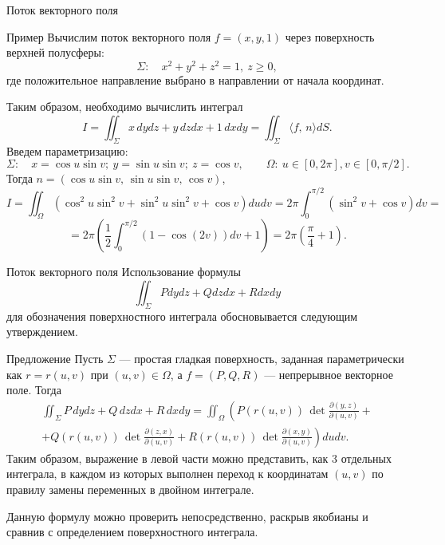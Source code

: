 \documentclass[8pt]{beamer}
\newcommand{\pp}[2]{\frac{\partial #1}{\partial #2}}
\newcommand{\ds}{\displaystyle}
\begin{document}

\begin{frame}{Поток векторного поля}
\begin{block}{Пример}
Вычислим поток векторного поля $f=(x,y,1)$ через поверхность верхней полусферы:
$$\Sigma:\quad x^2+y^2+z^2=1,\ z\ge 0,$$
где положительное направление выбрано в направлении от начала координат.

Таким образом, необходимо вычислить интеграл
$$I = \iint_\Sigma x\,dydz+y\,dzdx+1\,dxdy = \iint_\Sigma \langle f,\,n\rangle dS.$$
Введем параметризацию:
$$\Sigma:\quad x=\cos u \sin v;\ y =\sin u \sin v;\ z=\cos v,\qquad \Omega:\ u \in[0,2\pi], v\in[0,\pi/2].$$
Тогда $\ds n = (\cos u \sin v,\, \sin u \sin v,\, \cos v)$,
$$I = \iint_\Omega \left( \cos^2 u \sin^2 v + \sin^2u \sin^2v+\cos v\right)dudv=2\pi \int_0^{\pi/2}(\sin^2 v+\cos v)dv = $$
$$ = 2\pi\left( \frac12 \int_0^{\pi/2}(1-\cos(2 v))dv+1\right) = 2\pi\left(\frac{\pi}{4}+1\right).$$

\end{block}
\end{frame}

\begin{frame}{Поток векторного поля}
Использование формулы
$$\iint_\Sigma Pdydz+Qdzdx+Rdxdy$$
для обозначения поверхностного интеграла обосновывается следующим утверждением.
\begin{block}{Предложение}
Пусть $\Sigma$ --- простая гладкая поверхность, заданная параметрически как $r=r(u,v)$ при $(u,v)\in\Omega$, а $f=(P,Q,R)$ --- непрерывное векторное поле. Тогда
\begin{multline*}
\iint_\Sigma P\, dydz+Q\, dzdx+R\, dxdy = \iint_\Omega\left( P(r(u,v))\, \det\pp{(y,z)}{(u,v)} +
\right. \\ \left.
+ Q(r(u,v))\, \det\pp{(z,x)}{(u,v)}+ R(r(u,v))\, \det\pp{(x,y)}{(u,v)}\right)dudv.
\end{multline*}
Таким образом, выражение в левой части можно представить, как 3 отдельных интеграла, в каждом из которых выполнен переход к координатам $(u,v)$ по правилу замены переменных в двойном интеграле.
\end{block}
Данную формулу можно проверить непосредственно, раскрыв якобианы и сравнив с определением поверхностного интеграла.
\end{frame}
\end{document}
